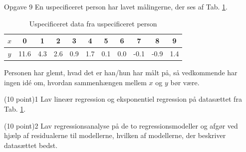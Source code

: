 \documentclass[12pt,x11names,a4paper]{article}
\begin{document}
\begin{opgavetekst}{Opgave 9}
En uspecificeret person har lavet målingerne, der ses af Tab. \ref{tab:tabel}. 
\begin{table}[H]
\centering
\begin{tabular}{c|c|c|c|c|c|c|c|c|c|c}
$x$ & 0 & 1 & 2 & 3 & 4 & 5 & 6 & 7 & 8 & 9\\
\hline 
$y$ & 11.6 & 4.3 & 2.6 & 0.9 & 1.7 & 0.1 & 0.0 & -0.1 &-0.9& 1.4
\end{tabular}
\caption{Uspecificeret data fra uspecificeret person}
\label{tab:tabel}
\end{table}
Personen har glemt, hvad det er han/hun har målt på, så vedkommende har ingen idé om, hvordan sammenhængen mellem $x$ og $y$ bør være.
\end{opgavetekst}

\begin{delopgave}{\colorbox{NorregGroen!40}{(10 point)}}{1}
Lav lineær regression og eksponentiel regression på datasættet fra Tab. \ref{tab:tabel}.
\end{delopgave}
\begin{delopgave}{(10 point)}{2}
Lav regressionsanalyse på de to regressionsmodeller og afgør ved hjælp af residualerne til modellerne, hvilken af modellerne, der beskriver datasættet bedst. 
\end{delopgave}
\end{document}
